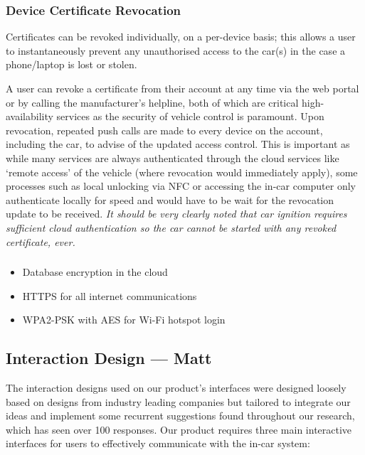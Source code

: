 \documentclass{article}
\begin{document}
\subsubsection{Device Certificate Revocation}
Certificates can be revoked individually, on a per-device basis; this allows a user to instantaneously prevent any unauthorised access to the car(s) in the case a phone/laptop is lost or stolen. 

A user can revoke a certificate from their account at any time via the web portal or by calling the manufacturer's helpline, both of which are critical high-availability services as the security of vehicle control is paramount. Upon revocation, repeated push calls are made to every device on the account, including the car, to advise of the updated access  control. This is important as while many services are always authenticated through the cloud services like `remote access' of the vehicle (where revocation would immediately apply), some processes such as local unlocking via NFC or accessing the in-car computer only authenticate locally for speed and would have to be wait for the revocation update to be received. \textit{It should be very clearly noted that car ignition requires sufficient cloud authentication so the car cannot be started with any revoked certificate, ever.}

\subsubsection{}

\begin{itemize}
  \item Database encryption in the cloud
  \item HTTPS for all internet communications
  \item WPA2-PSK with AES for Wi-Fi hotspot login
\end{itemize}

\subsection{Interaction Design --- Matt}\label{ssec:interaction-design}
The interaction designs used on our product's interfaces were designed loosely based on designs from industry leading companies but tailored to integrate our ideas and implement some recurrent suggestions found throughout our research, which has seen over 100 responses. Our product requires three main interactive interfaces for users to effectively communicate with the in-car system:
\end{document}
